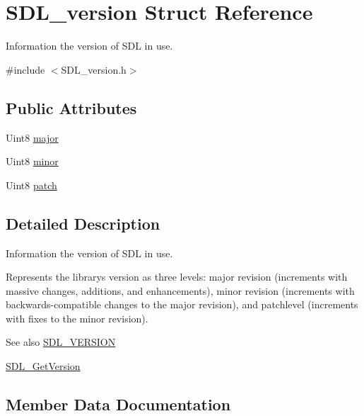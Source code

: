 \hypertarget{struct_s_d_l__version}{}\section{S\+D\+L\+\_\+version Struct Reference}
\label{struct_s_d_l__version}


Information the version of S\+DL in use.  




{\ttfamily \#include $<$S\+D\+L\+\_\+version.\+h$>$}

\subsection*{Public Attributes}
\begin{DoxyCompactItemize}
\item 
Uint8 \mbox{\hyperlink{struct_s_d_l__version_ad7d7674532073eed237b90f546c97cd0}{major}}
\item 
Uint8 \mbox{\hyperlink{struct_s_d_l__version_a6c35c7bf80245028d5970e6a504ecf57}{minor}}
\item 
Uint8 \mbox{\hyperlink{struct_s_d_l__version_aa6dacff18edee8cd037c773b843be0f1}{patch}}
\end{DoxyCompactItemize}


\subsection{Detailed Description}
Information the version of S\+DL in use. 

Represents the library\textquotesingle{}s version as three levels\+: major revision (increments with massive changes, additions, and enhancements), minor revision (increments with backwards-\/compatible changes to the major revision), and patchlevel (increments with fixes to the minor revision).

\begin{DoxySeeAlso}{See also}
\mbox{\hyperlink{_s_d_l__version_8h_a7154bc5c2a95a644b5187e4225cdcbd0}{S\+D\+L\+\_\+\+V\+E\+R\+S\+I\+ON}} 

\mbox{\hyperlink{_s_d_l__version_8h_a4204ecbb600f51ee50515979e60bf8f3}{S\+D\+L\+\_\+\+Get\+Version}} 
\end{DoxySeeAlso}


\subsection{Member Data Documentation}
\mbox{\label{struct_s_d_l__version_ad7d7674532073eed237b90f546c97cd0}} 
